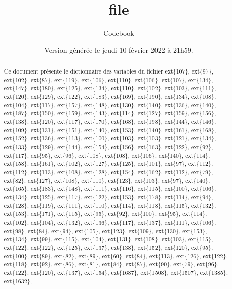 \documentclass[a4paper,]{article}
\title{file}
\subtitle{Codebook}
\author{}
\date{Version générée le jeudi 10 février 2022 à 21h59.}
\begin{document}
\maketitle
\begin{abstract}
Ce document présente le dictionnaire des variables du fichier
ext\{107\}, ext\{97\}, ext\{102\}, ext\{87\}, ext\{119\}, ext\{106\},
ext\{110\}, ext\{106\}, ext\{107\}, ext\{134\}, ext\{147\}, ext\{180\},
ext\{125\}, ext\{134\}, ext\{110\}, ext\{102\}, ext\{103\}, ext\{111\},
ext\{120\}, ext\{129\}, ext\{122\}, ext\{183\}, ext\{169\}, ext\{190\},
ext\{134\}, ext\{108\}, ext\{104\}, ext\{117\}, ext\{157\}, ext\{148\},
ext\{130\}, ext\{140\}, ext\{136\}, ext\{140\}, ext\{187\}, ext\{150\},
ext\{159\}, ext\{143\}, ext\{114\}, ext\{127\}, ext\{159\}, ext\{156\},
ext\{138\}, ext\{120\}, ext\{117\}, ext\{170\}, ext\{168\}, ext\{198\},
ext\{144\}, ext\{146\}, ext\{109\}, ext\{131\}, ext\{151\}, ext\{140\},
ext\{153\}, ext\{140\}, ext\{161\}, ext\{168\}, ext\{152\}, ext\{136\},
ext\{113\}, ext\{100\}, ext\{103\}, ext\{103\}, ext\{121\}, ext\{134\},
ext\{133\}, ext\{129\}, ext\{144\}, ext\{154\}, ext\{156\}, ext\{163\},
ext\{122\}, ext\{92\}, ext\{117\}, ext\{95\}, ext\{96\}, ext\{108\},
ext\{108\}, ext\{106\}, ext\{140\}, ext\{114\}, ext\{158\}, ext\{161\},
ext\{102\}, ext\{127\}, ext\{125\}, ext\{101\}, ext\{97\}, ext\{112\},
ext\{112\}, ext\{113\}, ext\{108\}, ext\{128\}, ext\{154\}, ext\{162\},
ext\{112\}, ext\{79\}, ext\{82\}, ext\{127\}, ext\{108\}, ext\{110\},
ext\{123\}, ext\{103\}, ext\{97\}, ext\{140\}, ext\{165\}, ext\{183\},
ext\{148\}, ext\{111\}, ext\{116\}, ext\{115\}, ext\{100\}, ext\{106\},
ext\{134\}, ext\{125\}, ext\{117\}, ext\{122\}, ext\{153\}, ext\{178\},
ext\{114\}, ext\{94\}, ext\{128\}, ext\{119\}, ext\{111\}, ext\{110\},
ext\{114\}, ext\{118\}, ext\{115\}, ext\{132\}, ext\{153\}, ext\{171\},
ext\{115\}, ext\{95\}, ext\{92\}, ext\{100\}, ext\{95\}, ext\{114\},
ext\{102\}, ext\{104\}, ext\{132\}, ext\{136\}, ext\{117\}, ext\{137\},
ext\{111\}, ext\{106\}, ext\{98\}, ext\{84\}, ext\{94\}, ext\{105\},
ext\{123\}, ext\{109\}, ext\{130\}, ext\{153\}, ext\{134\}, ext\{99\},
ext\{115\}, ext\{104\}, ext\{131\}, ext\{108\}, ext\{103\}, ext\{115\},
ext\{122\}, ext\{122\}, ext\{125\}, ext\{137\}, ext\{138\}, ext\{152\},
ext\{120\}, ext\{95\}, ext\{100\}, ext\{89\}, ext\{82\}, ext\{89\},
ext\{60\}, ext\{84\}, ext\{113\}, ext\{126\}, ext\{122\}, ext\{118\},
ext\{92\}, ext\{86\}, ext\{81\}, ext\{84\}, ext\{87\}, ext\{90\},
ext\{79\}, ext\{96\}, ext\{122\}, ext\{120\}, ext\{137\}, ext\{154\},
ext\{1687\}, ext\{1508\}, ext\{1507\}, ext\{1385\}, ext\{1632\},

\end{abstract}
\end{document}
